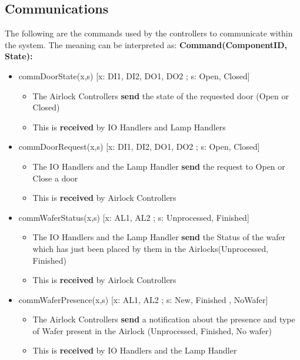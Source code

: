 \documentclass[a4paper,12pt]{article}
\begin{document}
	\subsection {Communications}
	The following are the commands used by the controllers to communicate within the system. The meaning can be interpreted as: 
	\bigskip
	\newline 
	\textbf{Command(ComponentID, State):}
	\begin{itemize}
		\item commDoorState(x,s) [x: DI1, DI2, DO1, DO2 ; s: Open, Closed] 
		\begin{itemize}
			\item The Airlock Controllers \textbf{send} the state of the requested door (Open or Closed)
			\item This is \textbf{received} by IO Handlers and Lamp Handlers
		\end{itemize}
		\bigskip
		
		\item commDoorRequest(x,s) [x: DI1, DI2, DO1, DO2 ; s: Open, Closed]
		\begin{itemize}
			\item The IO Handlers and the Lamp Handler \textbf{send} the request to Open or Close a door 
			\item This is \textbf{received} by Airlock Controllers
		\end{itemize}
		\bigskip
		
		\item commWaferStatus(x,s) [x: AL1, AL2 ; s: Unprocessed, Finished]
		\begin{itemize}
			\item The IO Handlers and the Lamp Handler \textbf{send} the Status of the wafer which has just been placed by them in the Airlocks(Unprocessed, Finished) 
			\item This is \textbf{received} by Airlock Controllers
		\end{itemize}
		\bigskip
		
		\item commWaferPresence(x,s) [x: AL1, AL2 ; s: New, Finished , NoWafer]
		\begin{itemize}
			\item The Airlock Controllers \textbf{send} a notification about the presence and type of Wafer present in the Airlock (Unprocessed, Finished, No wafer) 
			\item This is \textbf{received} by IO Handlers and the Lamp Handler
		\end{itemize}
	\end{itemize}
	\newpage
\end{document}
